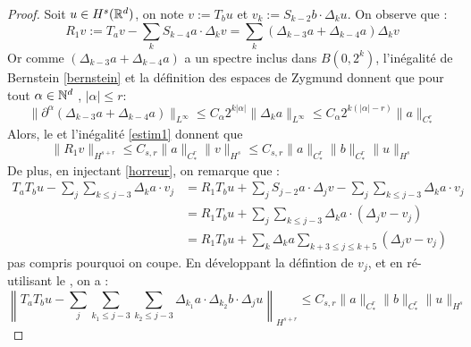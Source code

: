 \documentclass[11pt,a4paper]{article}
\begin{document}
\begin{proof}
Soit $u\in H^s(\mathbb R^d)$, on note $v:=T_bu$ et $v_k:=S_{k-2}b\cdot\Delta_ku$. On observe que :
\begin{equation}\label{horreur}
R_1v:=T_av-\sum_k S_{k-4}a\cdot\Delta_kv = \sum_k (\Delta_{k-3}a + \Delta_{k-4}a)\Delta_kv
\end{equation}
Or comme $(\Delta_{k-3}a + \Delta_{k-4}a)$ a un spectre inclus dans $B(0,2^k)$, l'inégalité de Bernstein \eqref{bernstein} et la définition des espaces de Zygmund donnent que pour tout $\alpha \in \mathbb N^d$ , $|\alpha| \leq r$:
\begin{equation*}
\|\partial^\alpha(\Delta_{k-3}a + \Delta_{k-4}a)\|_{L^\infty} \leq C_\alpha 2^{k|\alpha|}\|\Delta_ka\|_{L^\infty} \leq C_\alpha 2^{k(|\alpha|-r)} \|a\|_{C^r_*}
\end{equation*}
Alors, le  et l'inégalité \eqref{estim1} donnent que 
\begin{equation*}
\|R_1v\|_{H^{s+r}} \leq C_{s,r} \|a\|_{C^r_*} \|v\|_{H^s} \leq C_{s,r} \|a\|_{C^r_*} \|b\|_{C^r_*} \|u\|_{H^s}
\end{equation*}
De plus, en injectant \eqref{horreur}, on remarque que :
\begin{align*}
T_aT_bu - \sum_j \sum_{k \leq j-3} \Delta_ka\cdot v_j &= R_1T_bu + \sum_j S_{j-2}a\cdot\Delta_jv - \sum_j \sum_{k \leq j-3} \Delta_ka\cdot v_j \\
&=R_1T_bu + \sum_j \sum_{k \leq j-3} \Delta_ka\cdot (\Delta_jv - v_j) \\
&=R_1T_bu + \sum_k \Delta_ka \sum_{k+3 \leq j \leq k+5} (\Delta_jv - v_j) 
\end{align*}
pas compris pourquoi on coupe. En développant la défintion de $v_j$, et en ré-utilisant le , on a :
\begin{equation}
\left\| T_aT_bu - \sum_j \sum_{k_1 \leq j-3} \sum_{k_2\leq j-3} \Delta_{k_1}a\cdot \Delta_{k_2}b \cdot \Delta_j u \right\|_{H^{s+r}} \leq C_{s,r} \|a\|_{C^r_*} \|b\|_{C^r_*} \|u\|_{H^s}
\end{equation}
\end{proof}















\newpage
\printbibliography[heading=bibintoc, title={Références}]
\end{document}
